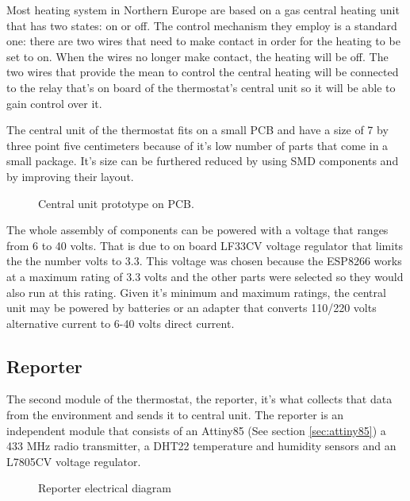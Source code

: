 \qquad Most heating system in Northern Europe are based on a gas central heating unit that has two states: on or off.
The control mechanism they employ is a standard one: there are two wires that need to make contact in order
for the heating to be set to on. When the wires no longer make contact, the heating will be off.
The two wires that provide the mean to control the central heating will be connected to the relay that's on
board of the thermostat's central unit so it will be able to gain control over it.

The central unit of the thermostat fits on a small PCB and have a size of 7 by three point five centimeters
because of it's low number of parts that come in a small package. It's size can be furthered reduced by using
SMD components and by improving their layout.

\begin{figure}[h!]
    \label{fig:central_unit_diag}
    \centerline{}
    \caption[Central Unit Prototype On PCB]{Central unit prototype on PCB.}
    \label{fig:central_unit_diag}
\end{figure}

\qquad The whole assembly of components can be powered with a voltage that ranges from 6 to 40 volts. That is due to
on board LF33CV voltage regulator that limits the the number volts to 3.3. This voltage was chosen because
the ESP8266 works at a maximum rating of 3.3 volts and the other parts were selected so they would also run
at this rating.
Given it's minimum and maximum ratings, the central unit may be powered by batteries or an adapter that
converts 110/220  volts alternative current to 6-40 volts direct current.



\subsection{Reporter}

\qquad The second module of the thermostat, the reporter, it's what collects that data from the environment and sends
it to central unit. The reporter is an independent module that consists of an Attiny85 (See section
\ref{sec:attiny85}) a 433 MHz radio transmitter, a DHT22 temperature and humidity sensors and an L7805CV voltage
regulator.

\begin{figure}[h!]
    \label{fig:reporter_diag}
    \centerline{}
    \caption[Reporter electrical diagram]{Reporter electrical diagram}
    \label{fig:reporter_diag}
\end{figure}

